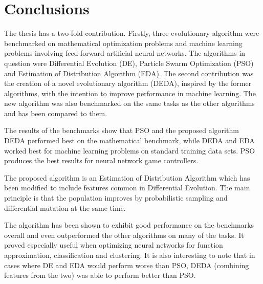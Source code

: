 \section{Conclusions}

The thesis has a two-fold contribution. Firstly, three evolutionary algorithm were benchmarked on mathematical optimization problems and machine learning problems involving feed-forward artificial neural networks. The algorithms in question were Differential Evolution (DE), Particle Swarm Optimization (PSO) and Estimation of Distribution Algorithm (EDA). The second contribution was the creation of a novel evolutionary algorithm (DEDA), inspired by the former algorithms, with the intention to improve performance in machine learning. The new algorithm was also benchmarked on the same tasks as the other algorithms and has been compared to them.

The results of the benchmarks show that PSO and the proposed algorithm DEDA performed best on the mathematical benchmark, while DEDA and EDA worked best for machine learning problems on standard training data sets. PSO produces the best results for neural network game controllers.

The proposed algorithm is an Estimation of Distribution Algorithm which has been modified to include features common in Differential Evolution. The main principle is that the population improves by probabilistic sampling and differential mutation at the same time.

The algorithm has been shown to exhibit good performance on the benchmarks overall and even outperformed the other algorithms on many of the tasks. It proved especially useful when optimizing neural networks for function approximation, classification and clustering. It is also interesting to note that in cases where DE and EDA would perform worse than PSO, DEDA (combining features from the two) was able to perform better than PSO.
